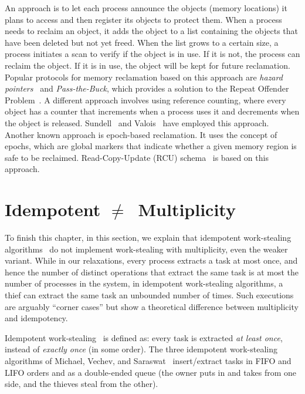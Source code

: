 An approach is to let each process announce the objects (memory locations) it plans to access and then register its objects to protect them. When a process needs to reclaim an object, it adds the object to a list containing the objects that have been deleted but not yet freed. When the list grows to a certain size, a process initiates a scan to verify if the object is in use.  If it is not, the process can reclaim the object. If it is in use, the object will be kept for future reclamation. Popular protocols for memory reclamation based on this approach are \textit{hazard pointers}~\cite{DBLP_journals_tpds_Michael04} and \emph{Pass-the-Buck}, which provides a solution to the Repeat Offender Problem~\cite{DBLP_conf_wdag_HerlihyLM02}. A different approach involves using reference counting, where every object has a counter that increments when a process uses it and decrements when the object is released. Sundell~\cite{DBLP_conf_ipps_Sundell05} and Valois~\cite{DBLP_conf_podc_Valois95} have employed this approach. Another known approach is epoch-based reclamation. It uses the concept of epochs, which are global markers that indicate whether a given memory region is safe to be reclaimed. Read-Copy-Update (RCU) schema~\cite{mckenney2001read} is based on this approach.

\section{\label{sec-idem-neq-mult}Idempotent \texorpdfstring{\(\neq\)}\ \ Multiplicity}

To finish this chapter, in this section, we explain that idempotent work-stealing algorithms~\cite{maged.vechev.2009} do not implement work-stealing with multiplicity, even the weaker variant.  While in our relaxations, every process extracts a task at most once, and hence the number of distinct operations that extract the same task is at most the number of processes in the system, in idempotent work-stealing algorithms, a thief can extract the same task an unbounded number of times.  Such executions are arguably ``corner cases'' but show a theoretical difference between multiplicity and idempotency.

Idempotent work-stealing~\cite{maged.vechev.2009} is defined as: every task is extracted \emph{at least once}, instead of \emph{exactly once} (in some order).  The three idempotent work-stealing algorithms of Michael, Vechev, and Saraswat~\cite{maged.vechev.2009} insert/extract tasks in FIFO and LIFO orders and as a double-ended queue (the owner puts in and takes from one side, and the thieves steal from the other).

